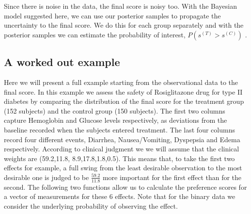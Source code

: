 \documentclass[11pt]{article}
\begin{document}
Since there is noise in the data, the final score is noisy too. With the
Bayesian model suggested here, we can use our posterior samples to
propagate the uncertainty to the final score. We do this for each group
separately and with the posterior samples we can estimate the
probability of interest, \(P(s^{(T)} > s^{(C)})\) .

\hypertarget{a-worked-out-example}{%
\subsection{A worked out example}\label{a-worked-out-example}}

Here we will present a full example starting from the observational data
to the final score. In this example we assess the safety of
Rosiglitazone drug for type II diabetes by comparing the distribution of
the final score for the treatment group (152 subjects) and the control
group (150 subjects). The first two columns capture Hemoglobin and
Glucose levels respectively, as deviations from the baseline recorded
when the subjects entered treatment. The last four columns record four
different events, Diarrhea, Nausea/Vomiting, Dyspepsia and Edema
respectively. According to clinical judgment we we will assume that the
clinical weights are (59.2,11.8, 8.9,17.8,1.8,0.5). This means that, to
take the first two effects for example, a full swing from the least
desirable observation to the most desirable one is judged to be
\(\frac{59.2}{11.8}\) more important for the first effect than for the
second. The following two functions allow us to calculate the preference
scores for a vector of measurements for these 6 effects. Note that for
the binary data we consider the underlying probability of observing the
effect.
\end{document}
